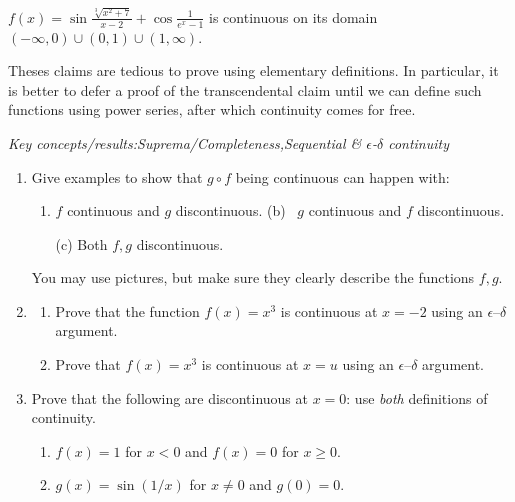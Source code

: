 \begin{example}{}{}
	$f(x)=\sin\frac{\sqrt[3]{x^2+7}}{x-2}+\cos\frac 1{e^x-1}$ is continuous on its domain $(-\infty,0)\cup(0,1)\cup(1,\infty)$.
\end{example}


Theses claims are tedious to prove using elementary definitions. In particular, it is better to defer a proof of the transcendental claim until we can define such functions using power series, after which continuity comes for free.


\vfil\goodbreak

\begin{exercises}
	\emph{Key concepts/results:\quad Suprema/Completeness,\quad Sequential \& $\epsilon$-$\delta$ continuity}


	\begin{enumerate}\itemsep0pt%
	  \item Give examples to show that $g\circ f$ being continuous can happen with:
	  \begin{enumerate}
	    \item $f$ continuous and $g$ discontinuous. \qquad\qquad (b) \ $g$ continuous and $f$ discontinuous.
	    \item[(c)] Both $f,g$ discontinuous.
	  \end{enumerate}
	  You may use pictures, but make sure they clearly describe the functions $f,g$.
	  
	  
	  \item\begin{enumerate}
	  	\item Prove that the function $f(x)=x^3$ is continuous at $x=-2$ using an $\epsilon$--$\delta$ argument.
	  	\item Prove that $f(x)=x^3$ is continuous at $x=u$ using an $\epsilon$--$\delta$ argument.
	  \end{enumerate}
	
	
		\item Prove that the following are discontinuous at $x=0$: use \emph{both} definitions of continuity.
		\begin{enumerate}
	  	\item $f(x)=1$ for $x<0$ and $f(x)=0$ for $x\ge 0$.
	  	\item $g(x)=\sin(1/x)$ for $x\neq 0$ and $g(0)=0$.
		\end{enumerate}
		

\end{enumerate}
\end{exercises}

